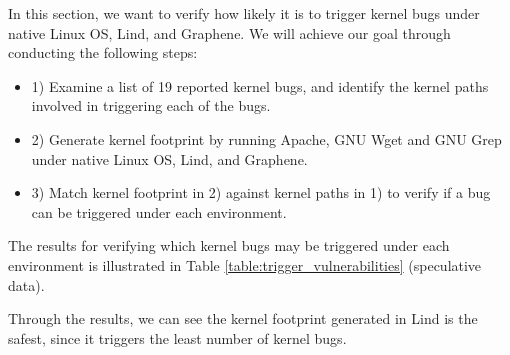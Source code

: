 In this section, we want to verify how likely it is to trigger kernel bugs under native Linux OS, Lind, and Graphene.
We will achieve our goal through conducting the following steps: \\

\begin{itemize}
  \item 1) Examine a list of 19 reported kernel bugs, and identify the kernel paths involved in triggering each of the bugs.
  \item 2) Generate kernel footprint by running Apache, GNU Wget and GNU Grep under native Linux OS, Lind, and Graphene. 
  \item 3) Match kernel footprint in 2) against kernel paths in 1) to verify if a bug can be triggered under each environment. 
\end{itemize}

The results for verifying which kernel bugs may be triggered under each environment is illustrated in Table 
\ref{table:trigger_vulnerabilities} (speculative data). 

Through the results, we can see the kernel footprint generated in Lind is the safest, 
since it triggers the least number of kernel bugs.

